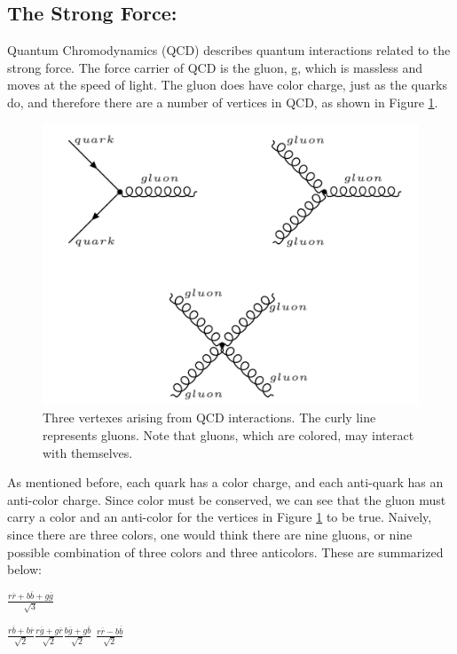 \subsection{The Strong Force:}
Quantum Chromodynamics (QCD) describes quantum interactions related to the strong force. The force carrier of QCD is the gluon, g, which is massless and moves at the speed of light. The gluon does have color charge, just as the quarks do, and therefore there are a number of vertices in QCD, as shown in Figure \ref{Fig:Intro:Vertex2}.
\begin{figure}[h]
    \centering
        \includegraphics[width=\textwidth]{F1/Vertex2}
        \caption{Three vertexes arising from QCD interactions. The curly line represents gluons. Note that gluons, which are colored, may interact with themselves.}
        \label{Fig:Intro:Vertex2}
\end{figure}
As mentioned before, each quark has a color charge, and each anti-quark has an anti-color charge. Since color must be conserved, we can see that the gluon must carry a color and an anti-color for the vertices in Figure \ref{Fig:Intro:Vertex2} to be true. Naively, since there are three colors, one would think there are nine gluons, or nine possible combination of three colors and three anticolors. These are summarized below:

{\centering

$\frac{r\overline{r} + b\overline{b} + g\overline{g}}{\sqrt{3}}$

}

{\centering

    $\frac{r\overline{b} + b\overline{r}}{\sqrt{2}}$\hspace{1cm}$\frac{r\overline{g} + g\overline{r}}{\sqrt{2}}$\hspace{1cm}$\frac{b\overline{g} + g\overline{b}}{\sqrt{2}}$\hspace{1cm} $\frac{r\overline{r} - b\overline{b}}{\sqrt{2}}$
    
    }


